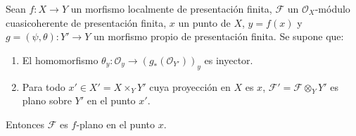 \begin{proposition}[11.5.3]
\label{IV.11.5.3}
Sean $f:X\to Y$ un morfismo localmente de presentación finita,
$\mathcal F$ un $\mathcal O_X$-módulo cuasicoherente de presentación finita, $x$ un punto de $X$, $y=f(x)$ y $g=(\psi,\theta):Y'\to Y$
un morfismo \textup{propio} de presentación finita. Se supone que:
\begin{enumerate}[label=\textup{(\roman*)}]
  \item El homomorfismo $\theta_y:\mathcal O_y\to
  (g_*(\mathcal O_{Y'}))_y$ es inyector.
  \item Para todo $x'\in X'=X\times_Y Y'$ cuya proyección en $X$ es $x$, $\mathcal F'=\mathcal F\otimes_Y Y'$ es
  plano sobre $Y'$ en el punto $x'$.
\end{enumerate}

Entonces $\mathcal F$ es $f$-plano en el punto $x$.
\end{proposition}

